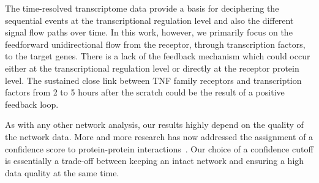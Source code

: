 \begin{itemize}
The time-resolved transcriptome data provide a basis for deciphering the
sequential events at the transcriptional regulation level and also the 
different signal flow paths over time. In this work, however, we primarily
focus on the feedforward unidirectional flow from the receptor, through
transcription factors, to the target genes. There is a lack of the 
feedback mechanism which could occur either at the transcriptional
regulation level or directly at the receptor protein level. The sustained 
close link
between TNF family receptors and transcription factors from 2 to 5 hours
after the scratch could be the result of a positive feedback loop.

As with any other network analysis, our results highly depend on the quality of
the network data. More and more research has now addressed the assignment of
a confidence score to protein-protein interactions~\citep{Kamburov2012}.
Our choice of a confidence cutoff is essentially a trade-off between keeping
an intact network and ensuring a high data quality at the same time.



\end{itemize}








